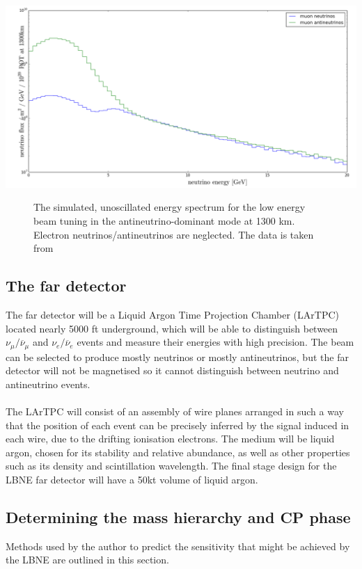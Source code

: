 \documentclass[12pt]{article}
\begin{document}
\begin{center}
\includegraphics[scale=0.4]{antineutrino_beam.png}
\begin{figure}[h!]
\caption{The simulated, unoscillated energy spectrum for the low energy beam tuning in the antineutrino-dominant mode at 1300 km. Electron neutrinos/antineutrinos are neglected. The data is taken from \cite{LBNE}}
\label{fig:spectrum2}
\end{figure}
\end{center}
\subsection{The far detector}
The far detector will be a Liquid Argon Time Projection Chamber  (LArTPC) located nearly 5000 ft underground, which will be able to distinguish between $\nu_{\mu}/\overline{\nu}_{\mu}$ and $\nu_{e}/\overline{\nu}_{e}$ events and measure their energies with high precision. The beam can be selected to produce mostly neutrinos or mostly antineutrinos, but the far detector will not be magnetised so it cannot distinguish between neutrino and antineutrino events\cite{LBNE}.\\\\
The LArTPC will consist of an assembly of wire planes arranged in such a way that the position of each event can be precisely inferred by the signal induced in each wire, due to the drifting ionisation electrons. The medium will be liquid argon, chosen for its stability and relative abundance, as well as other properties such as its density and scintillation wavelength. The final stage design for the LBNE far detector will have a 50kt volume of liquid argon.
\subsection{Determining the mass hierarchy and CP phase}
Methods used by the author to predict the sensitivity that might be achieved by the LBNE are outlined in this section.
\end{document}
